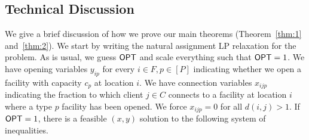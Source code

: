 %
%

\subsection{Technical Discussion} 
We give a brief discussion of how we prove our main theorems (Theorem~\ref{thm:1} and~\ref{thm:2}). 
We start by writing the natural assignment LP relaxation for the problem. As is usual, we guess $\mathsf{OPT}$ and scale everything such that $\mathsf{OPT} = 1$.
We have opening  variables $y_{ip}$ for every $i\in F,p\in [P]$ indicating whether we open a facility with capacity $c_p$ at location $i$.
We have connection variables $x_{ijp}$ indicating the fraction to which client $j\in C$ connects to a facility at location $i$ where a type $p$ facility has been opened. 
We force $x_{ijp} = 0$ for all $d(i,j) > 1$.
If $\mathsf{OPT} = 1$, there is a feasible $(x,y)$ solution to the following system of inequalities.\smallskip

